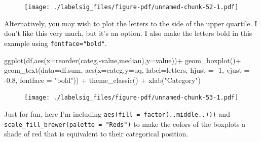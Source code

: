 \documentclass[
  letterpaper,
  DIV=11,
  numbers=noendperiod]{scrreprt}
\newenvironment{Shaded}{\begin{snugshade}}{\end{snugshade}}
\newcommand{\AttributeTok}[1]{\textcolor[rgb]{0.40,0.45,0.13}{#1}}
\newcommand{\DecValTok}[1]{\textcolor[rgb]{0.68,0.00,0.00}{#1}}
\newcommand{\FloatTok}[1]{\textcolor[rgb]{0.68,0.00,0.00}{#1}}
\newcommand{\FunctionTok}[1]{\textcolor[rgb]{0.28,0.35,0.67}{#1}}
\newcommand{\NormalTok}[1]{\textcolor[rgb]{0.00,0.23,0.31}{#1}}
\newcommand{\SpecialCharTok}[1]{\textcolor[rgb]{0.37,0.37,0.37}{#1}}
\newcommand{\StringTok}[1]{\textcolor[rgb]{0.13,0.47,0.30}{#1}}
\begin{document}
\begin{figure}[H]

{\centering \texttt{[image: ./labelsig\_files/figure-pdf/unnamed-chunk-52-1.pdf]}

}

\end{figure}

Alternatively, you may wish to plot the letters to the side of the upper
quartile. I don't like this very much, but it's an option. I also make
the letters bold in this example using \texttt{fontface="bold"}.

\begin{Shaded}
\begin{Highlighting}[]
\FunctionTok{ggplot}\NormalTok{(df,}\FunctionTok{aes}\NormalTok{(}\AttributeTok{x=}\FunctionTok{reorder}\NormalTok{(categ,}\SpecialCharTok{{-}}\NormalTok{value,median),}\AttributeTok{y=}\NormalTok{value))}\SpecialCharTok{+}
  \FunctionTok{geom\_boxplot}\NormalTok{()}\SpecialCharTok{+}
  \FunctionTok{geom\_text}\NormalTok{(}\AttributeTok{data=}\NormalTok{df.sum,}
            \FunctionTok{aes}\NormalTok{(}\AttributeTok{x=}\NormalTok{categ,}\AttributeTok{y=}\NormalTok{uq,}
                \AttributeTok{label=}\NormalTok{letters,}
                \AttributeTok{hjust =} \SpecialCharTok{{-}}\DecValTok{1}\NormalTok{, }
                \AttributeTok{vjust =} \SpecialCharTok{{-}}\FloatTok{0.8}\NormalTok{, }
                \AttributeTok{fontface =} \StringTok{"bold"}\NormalTok{)) }\SpecialCharTok{+}
  \FunctionTok{theme\_classic}\NormalTok{() }\SpecialCharTok{+}
  \FunctionTok{xlab}\NormalTok{(}\StringTok{"Category"}\NormalTok{)}
\end{Highlighting}
\end{Shaded}

\begin{figure}[H]

{\centering \texttt{[image: ./labelsig\_files/figure-pdf/unnamed-chunk-53-1.pdf]}

}

\end{figure}

Just for fun, here I'm including
\texttt{aes(fill\ =\ factor(..middle..)))} and
\texttt{scale\_fill\_brewer(palette\ =\ "Reds")} to make the colors of
the boxplots a shade of red that is equivalent to their categorical
position.
\end{document}
